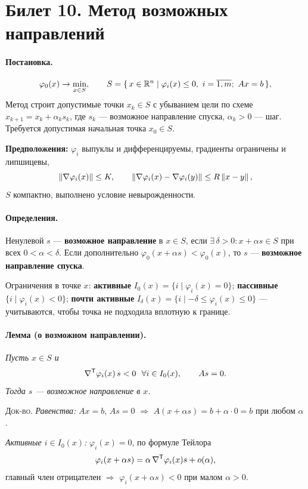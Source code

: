 \section{Билет 10. Метод возможных направлений}


\paragraph{Постановка.}
\[
  \varphi_0(x) \to \min_{x \in S} ,
  \qquad
  S = \{\, x \in \mathbb{R}^n \mid \varphi_i(x) \le 0,\ i = \overline{1,m};\ Ax = b \,\} ,
\]
Метод строит допустимые точки $x_k \in S$ с убыванием цели по схеме
$x_{k+1} = x_k + \alpha_k s_k$, где $s_k$ — возможное направление спуска,
$\alpha_k > 0$ — шаг. Требуется допустимая начальная точка $x_0 \in S$.

\textbf{Предположения:} $\varphi_i$ выпуклы и дифференцируемы, градиенты
ограничены и липшицевы,
\[
  \left\lVert \nabla\varphi_i(x) \right\rVert \le K , \qquad
  \left\lVert \nabla\varphi_i(x) - \nabla\varphi_i(y) \right\rVert \le R\left\lVert x-y \right\rVert ,
\]
$S$ компактно, выполнено условие невырожденности.

\paragraph{Определения.}
Ненулевой $s$ — \textbf{возможное направление} в $x \in S$, если
$\exists\,\delta > 0 : x + \alpha s \in S$ при всех $0 < \alpha < \delta$.
Если дополнительно $\varphi_0(x + \alpha s) < \varphi_0(x)$, то $s$ —
\textbf{возможное направление спуска}.

Ограничения в точке $x$: \textbf{активные}
$I_0(x) = \{i \mid \varphi_i(x) = 0\}$; \textbf{пассивные}
$\{i \mid \varphi_i(x) < 0\}$; \textbf{почти активные}
$I_\delta(x) = \{i \mid -\delta \le \varphi_i(x) \le 0\}$ — учитываются,
чтобы точка не подходила вплотную к границе.

\paragraph{Лемма (о возможном направлении).}
\textit{Пусть $x \in S$ и}
\[
  \nabla\T\varphi_i(x)\,s < 0 \ \ \forall i \in I_0(x) ,
  \qquad As = 0 .
\]
\textit{Тогда $s$ — возможное направление в $x$.}

\textsc{Док-во.} \emph{Равенства:} $Ax = b$, $As = 0$ $\Rightarrow$
$A(x + \alpha s) = b + \alpha\cdot 0 = b$ при любом $\alpha$.

\emph{Активные $i \in I_0(x)$:} $\varphi_i(x) = 0$, по формуле Тейлора
\[
  \varphi_i(x + \alpha s) = \alpha\,\nabla^{\mathsf{T}}\varphi_i(x)s + o(\alpha) ,
\]
главный член отрицателен $\Rightarrow$ $\varphi_i(x+\alpha s) < 0$ при малом
$\alpha > 0$.

